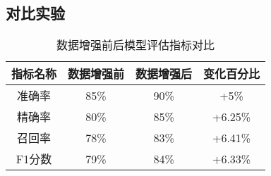\subsection{对比实验}
\begin{table}[h]
    \centering
    \caption{数据增强前后模型评估指标对比}
    \begin{tabular}{|c|c|c|c|}
        \hline
        \textbf{指标名称} & \textbf{数据增强前} & \textbf{数据增强后} & \textbf{变化百分比} \\ \hline
        准确率 & 85\% & 90\% & +5\% \\ \hline
        精确率 & 80\% & 85\% & +6.25\% \\ \hline
        召回率 & 78\% & 83\% & +6.41\% \\ \hline
        F1分数 & 79\% & 84\% & +6.33\% \\ \hline
    \end{tabular}
    \label{tab:comparison}
\end{table}
 


